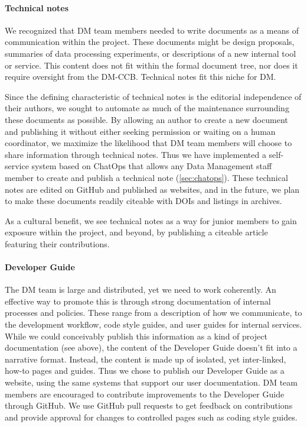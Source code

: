 \paragraph{Technical notes}

We recognized that DM team members needed to write documents as a means of communication within the project.
These documents might be design proposals, summaries of data processing experiments, or descriptions of a new internal tool or service.
This content does not fit within the formal document tree, nor does it require oversight from the DM-CCB.
Technical notes fit this niche for DM.

Since the defining characteristic of technical notes is the editorial independence of their authors, we sought to automate as much of the maintenance surrounding these documents as possible.
By allowing an author to create a new document and publishing it without either seeking permission or waiting on a human coordinator, we maximize the likelihood that DM team members will choose to share information through technical notes.
Thus we have implemented a self-service system based on ChatOps that allows any Data Management staff member to create and publish a technical note (\ref{sec:chatops}).
These technical notes are edited on GitHub and published as websites, and in the future, we plan to make these documents readily citeable with DOIs and listings in archives.

As a cultural benefit, we see technical notes as a way for junior members to gain exposure within the project, and beyond, by publishing a citeable article featuring their contributions.

\paragraph{Developer Guide}

The DM team is large and distributed, yet we need to work coherently.
An effective way to promote this is through strong documentation of internal processes and policies.
These range from a description of how we communicate, to the development workflow, code style guides, and user guides for internal services.
While we could conceivably publish this information as a kind of project documentation (see above), the content of the Developer Guide doesn't fit into a narrative format.
Instead, the content is made up of isolated, yet inter-linked, how-to pages and guides.
Thus we chose to publish our Developer Guide as a website,\cite{devguide} using the same systems that support our user documentation.
DM team members are encouraged to contribute improvements to the Developer Guide through GitHub.
We use GitHub pull requests to get feedback on contributions and provide approval for changes to controlled pages such as coding style guides.

